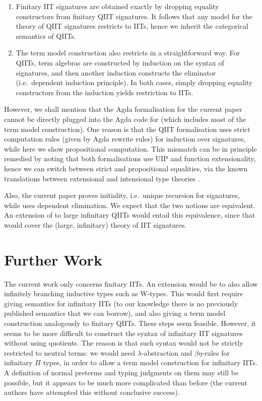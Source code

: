 \documentclass[a4paper,UKenglish,cleveref, autoref]{lipics-v2019}
\begin{document}
\begin{enumerate}
\item
  Finitary IIT signatures are obtained exactly by dropping equality constructors from
  finitary QIIT signatures. It follows that any model for the theory of QIIT signatures
  restricts to IITs, hence we inherit the categorical semantics of QIITs.
\item
  The term model construction also restricts in a straightforward way. For QIITs,
  term algebras are constructed by induction on the syntax of signatures, and
  then another induction constructs the eliminator (i.e.\ dependent induction
  principle). In both cases, simply dropping equality constructors from the
  induction yields restriction to IITs.
\end{enumerate}

However, we shall mention that the Agda formalisation for the current paper
cannot be directly plugged into the Agda code for
\cite{Kaposi:2019:CQI:3302515.3290315} (which includes most of the term model
construction). One reason is that the QIIT formalisation uses strict computation
rules (given by Agda rewrite rules) for induction over signatures, while here we show propositional
computation. This mismatch can be in principle remedied by noting that both
formalisations use UIP and function extensionality, hence we can switch between
strict and propositional equalities, via the known translations between
extensional and intensional type
theories \cite{hofmann95extensional,winterhalter2019eliminating}.

Also, the current paper proves initiality, i.e.\ unique recursion for
signatures, while \cite{Kaposi:2019:CQI:3302515.3290315} uses dependent
elimination. We expect that the two notions are equivalent. An extension of
\cite{Kaposi:2019:CQI:3302515.3290315} to large infinitary QIITs would entail
this equivalence, since that would cover the (large, infinitary) theory of IIT
signatures.


\section{Further Work}

The current work only concerns finitary IITs. An extension would be to also
allow infinitely branching inductive types such as W-types. This would first
require giving semantics for infinitary IITs (to our knowledge there is no
previously published semantics that we can borrow), and also giving a term model
construction analogously to finitary QIITs. These steps seem feasible. However,
it seems to be more difficult to construct the syntax of infinitary IIT
signatures without using quotients. The reason is that such syntax would not be
strictly restricted to neutral terms: we would need $\lambda$-abstraction and
$\beta\eta$-rules for infinitary $\Pi$ types, in order to allow a term model
construction for infinitary IITs. A definition of normal preterms and typing
judgments on them may still be possible, but it appears to be much more
complicated than before (the current authors have attempted this without
conclusive success).
\end{document}
